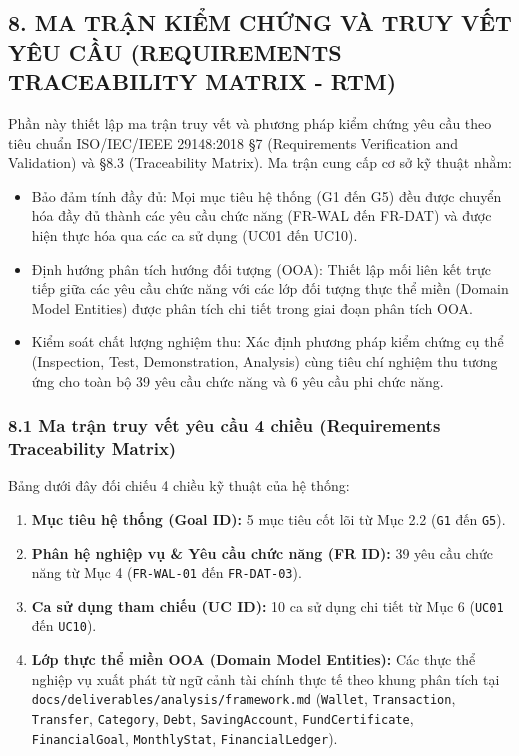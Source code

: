\documentclass[11pt,a4paper]{article}
\providecommand{\tightlist}{
  \setlength{\itemsep}{0pt}\setlength{\parskip}{0pt}}
\begin{document}
\clearpage
\subsection{8. MA TRẬN KIỂM CHỨNG VÀ TRUY VẾT YÊU CẦU (REQUIREMENTS
TRACEABILITY MATRIX -
RTM)}\label{8-ma-trux1eadn-kiux1ec3m-chux1ee9ng-vuxe0-truy-vux1ebft-yuxeau-cux1ea7u-requirements-traceability-matrix---rtm}

Phần này thiết lập ma trận truy vết và phương pháp kiểm chứng yêu cầu
theo tiêu chuẩn ISO/IEC/IEEE 29148:2018 §7 (Requirements Verification
and Validation) và §8.3 (Traceability Matrix). Ma trận cung cấp cơ sở kỹ
thuật nhằm:

\begin{itemize}
\tightlist
\item
  Bảo đảm tính đầy đủ: Mọi mục tiêu hệ thống (G1 đến G5) đều được chuyển
  hóa đầy đủ thành các yêu cầu chức năng (FR-WAL đến FR-DAT) và được
  hiện thực hóa qua các ca sử dụng (UC01 đến UC10).
\item
  Định hướng phân tích hướng đối tượng (OOA): Thiết lập mối liên kết
  trực tiếp giữa các yêu cầu chức năng với các lớp đối tượng thực thể
  miền (Domain Model Entities) được phân tích chi tiết trong giai đoạn
  phân tích OOA.
\item
  Kiểm soát chất lượng nghiệm thu: Xác định phương pháp kiểm chứng cụ
  thể (Inspection, Test, Demonstration, Analysis) cùng tiêu chí nghiệm
  thu tương ứng cho toàn bộ 39 yêu cầu chức năng và 6 yêu cầu phi chức
  năng.
\end{itemize}

\subsubsection{8.1 Ma trận truy vết yêu cầu 4 chiều (Requirements
Traceability
Matrix)}\label{81-ma-trux1eadn-truy-vux1ebft-yuxeau-cux1ea7u-4-chiux1ec1u-requirements-traceability-matrix}

Bảng dưới đây đối chiếu 4 chiều kỹ thuật của hệ thống:

\begin{enumerate}
\def\labelenumi{\arabic{enumi}.}
\tightlist
\item
  \textbf{Mục tiêu hệ thống (Goal ID):} 5 mục tiêu cốt lõi từ Mục 2.2
  (\texttt{G1} đến \texttt{G5}).
\item
  \textbf{Phân hệ nghiệp vụ \& Yêu cầu chức năng (FR ID):} 39 yêu cầu
  chức năng từ Mục 4 (\texttt{FR-WAL-01} đến \texttt{FR-DAT-03}).
\item
  \textbf{Ca sử dụng tham chiếu (UC ID):} 10 ca sử dụng chi tiết từ Mục
  6 (\texttt{UC01} đến \texttt{UC10}).
\item
  \textbf{Lớp thực thể miền OOA (Domain Model Entities):} Các thực thể
  nghiệp vụ xuất phát từ ngữ cảnh tài chính thực tế theo khung phân tích
  tại \texttt{docs/deliverables/analysis/framework.md} (\texttt{Wallet},
  \texttt{Transaction}, \texttt{Transfer}, \texttt{Category},
  \texttt{Debt}, \texttt{SavingAccount}, \texttt{FundCertificate},
  \texttt{FinancialGoal}, \texttt{MonthlyStat},
  \texttt{FinancialLedger}).
\end{enumerate}
\end{document}

